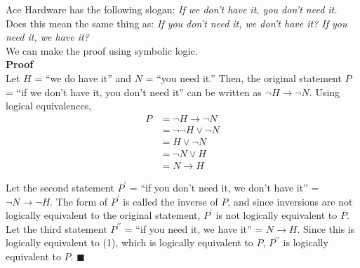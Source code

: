 \documentclass{article}
\begin{document}
Ace Hardware has the following slogan: \textit{If we don't have it, you don't need it.} Does this mean the same thing as: \textit{If you don't need it, we don't have it? If you need it, we have it?}\\ 

We can make the proof using symbolic logic.\\

\textbf{Proof}\\
Let $H$ = ``we do have it'' and $N$ = ``you need it.'' Then, the original statement $P$ = ``if we don't have it, you don't need it'' can be written as $\neg H \rightarrow \neg N$. Using logical equivalences,
\begin{align}
P &= \neg H \rightarrow \neg N \nonumber \\
&= \neg\neg H \vee \neg N \nonumber \\
&= H \vee \neg N \nonumber \\
&= \neg N \vee H \nonumber \\
&= N \rightarrow H
\end{align}

Let the second statement $P^\prime$ = ``if you don't need it, we don't have it'' = $\neg N \rightarrow \neg H$. The form of $P^\prime$ is called the inverse of $P$, and since inversions are not logically equivalent to the original statement, $P^\prime$ is not logically equivalent to $P$.\\

Let the third statement $P^{\prime\prime}$ = ``if you need it, we have it'' = $N \rightarrow H$. Since this is logically equivalent to (1), which is logically equivalent to $P$, $P^{\prime\prime}$ is logically equivalent to $P$. \hfill $\blacksquare$
\end{document}
